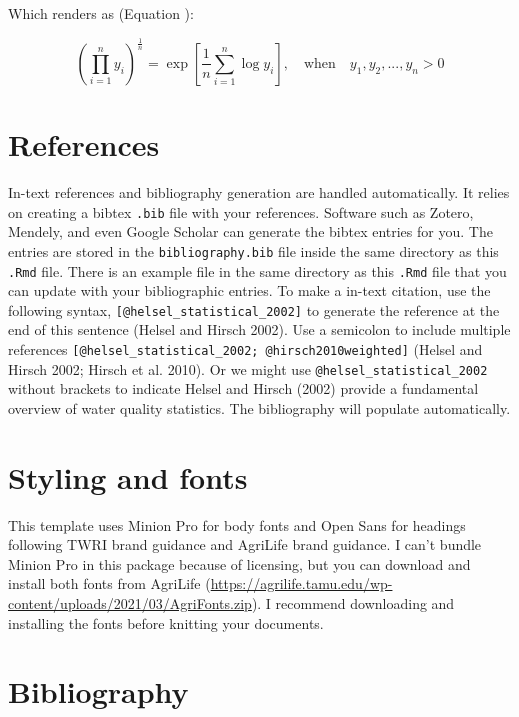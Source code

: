 \documentclass[fontsize=11pt,
titlepage=true,
footnotes=multiple
]{scrartcl}
\renewcommand{\eqref}{\Cref}
\begin{document}
Which renders as (Equation \eqref{eq:gmean}):

\begin{equation}
\left(\prod_{i=1}^{n}y_i\right)^{\frac{1}{n}} = 
\exp\left[\frac{1}{n}\sum_{i=1}^n\log{y_i}\right], 
\quad \textrm{when} \quad y_1, y_2, ..., y_n > 0
\label{eq:gmean}
\end{equation}

\hypertarget{references}{%
\section{References}\label{references}}

In-text references and bibliography generation are handled automatically. It relies on creating a bibtex \texttt{.bib} file with your references. Software such as Zotero, Mendely, and even Google Scholar can generate the bibtex entries for you. The entries are stored in the \texttt{bibliography.bib} file inside the same directory as this \texttt{.Rmd} file. There is an example file in the same directory as this \texttt{.Rmd} file that you can update with your bibliographic entries. To make a in-text citation, use the following syntax, \texttt{{[}@helsel\_statistical\_2002{]}} to generate the reference at the end of this sentence (Helsel and Hirsch 2002). Use a semicolon to include multiple references \texttt{{[}@helsel\_statistical\_2002;\ @hirsch2010weighted{]}} (Helsel and Hirsch 2002; Hirsch et al. 2010). Or we might use \texttt{@helsel\_statistical\_2002} without brackets to indicate Helsel and Hirsch (2002) provide a fundamental overview of water quality statistics. The bibliography will populate automatically.

\hypertarget{styling-and-fonts}{%
\section{Styling and fonts}\label{styling-and-fonts}}

This template uses Minion Pro for body fonts and Open Sans for headings following TWRI brand guidance and AgriLife brand guidance. I can't bundle Minion Pro in this package because of licensing, but you can download and install both fonts from AgriLife (\url{https://agrilife.tamu.edu/wp-content/uploads/2021/03/AgriFonts.zip}). I recommend downloading and installing the fonts before knitting your documents.

\hypertarget{bibliography}{%
\section*{Bibliography}\label{bibliography}}
\end{document}
